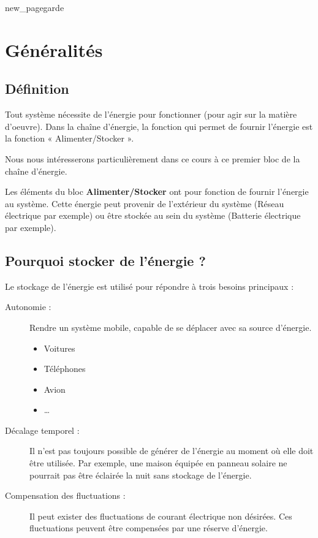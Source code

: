 \documentclass[10pt,fleqn]{article} %
\begin{document}
{new_pagegarde}
\section{Généralités}
\subsection{Définition}
Tout système nécessite de l’énergie pour fonctionner (pour agir sur la matière d'oeuvre). Dans la chaîne d’énergie, la fonction qui permet de fournir l’énergie est la fonction « Alimenter/Stocker ».

Nous nous intéresserons particulièrement dans ce cours à ce premier bloc de la chaîne d'énergie.

\begin{defi}
    Les éléments du bloc \textbf{Alimenter/Stocker} ont pour fonction de fournir l'énergie au système. Cette énergie peut provenir de l'extérieur du système (Réseau électrique par exemple) ou être stockée au sein du système (Batterie électrique par exemple).
\end{defi}


\subsection{Pourquoi stocker de l'énergie ?}
Le stockage de l'énergie est utilisé pour répondre à trois besoins principaux :
\begin{description}
    \item[Autonomie : ] Rendre un système mobile, capable de se déplacer avec sa source d'énergie.
    \begin{itemize}
        \item Voitures
        \item Téléphones
        \item Avion
        \item \dots
    \end{itemize}
    \item[Décalage temporel : ] Il n'est pas toujours possible de générer de l'énergie au moment où elle doit être utilisée. Par exemple, une maison équipée en panneau solaire ne pourrait pas être éclairée la nuit sans stockage de l'énergie.
    \item[Compensation des fluctuations : ]Il peut exister des fluctuations de courant électrique non désirées. Ces fluctuations peuvent être compensées par une réserve d'énergie.
\end{description}
\end{document}
